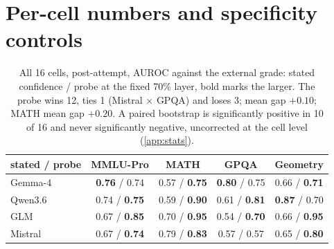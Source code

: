 \section{Per-cell numbers and specificity controls}
\label{app:cells}
\begin{table}[H]
\caption{All 16 cells, post-attempt, AUROC against the external grade: stated confidence / probe at the fixed 70\% layer, bold marks the larger. The probe wins 12, ties 1 (Mistral $\times$ GPQA) and loses 3; mean gap $+0.10$; MATH mean gap $+0.20$. A paired bootstrap is significantly positive in 10 of 16 and never significantly negative, uncorrected at the cell level (\cref{app:stats}).}
\label{tab:cells}
\centering\small
\begin{tabular}{@{}lcccc@{}}
\toprule
\textbf{stated / probe} & \textbf{MMLU-Pro} & \textbf{MATH} & \textbf{GPQA} & \textbf{Geometry} \\
\midrule
Gemma-4 & \textbf{0.76} / 0.74 & 0.57 / \textbf{0.75} & \textbf{0.80} / 0.75 & 0.66 / \textbf{0.71} \\
Qwen3.6 & 0.74 / \textbf{0.75} & 0.59 / \textbf{0.90} & 0.61 / \textbf{0.81} & \textbf{0.87} / 0.70 \\
GLM & 0.67 / \textbf{0.85} & 0.70 / \textbf{0.95} & 0.54 / \textbf{0.70} & 0.66 / \textbf{0.95} \\
Mistral & 0.67 / \textbf{0.74} & 0.79 / \textbf{0.83} & 0.57 / 0.57 & 0.65 / \textbf{0.80} \\
\bottomrule
\end{tabular}
\end{table}

